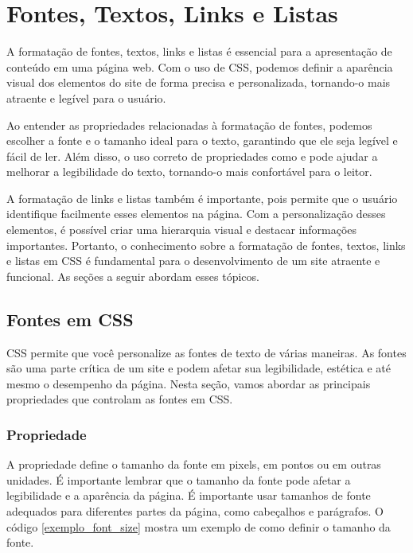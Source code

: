 \chapter{Fontes, Textos, Links e Listas}

A formatação de fontes, textos, links e listas é essencial para a apresentação de conteúdo em uma página web. Com o uso de CSS, podemos definir a aparência visual dos elementos do site de forma precisa e personalizada, tornando-o mais atraente e legível para o usuário.

Ao entender as propriedades relacionadas à formatação de fontes, podemos escolher a fonte e o tamanho ideal para o texto, garantindo que ele seja legível e fácil de ler. Além disso, o uso correto de propriedades como  e  pode ajudar a melhorar a legibilidade do texto, tornando-o mais confortável para o leitor.

A formatação de links e listas também é importante, pois permite que o usuário identifique facilmente esses elementos na página. Com a personalização desses elementos, é possível criar uma hierarquia visual e destacar informações importantes. Portanto, o conhecimento sobre a formatação de fontes, textos, links e listas em CSS é fundamental para o desenvolvimento de um site atraente e funcional. As seções a seguir abordam esses tópicos.

\section{Fontes em CSS}

CSS permite que você personalize as fontes de texto de várias maneiras. As fontes são uma parte crítica de um site e podem afetar sua legibilidade, estética e até mesmo o desempenho da página. Nesta seção, vamos abordar as principais propriedades que controlam as fontes em CSS.

\subsection{Propriedade }

A propriedade  define o tamanho da fonte em pixels, em pontos ou em outras unidades. É importante lembrar que o tamanho da fonte pode afetar a legibilidade e a aparência da página. É importante usar tamanhos de fonte adequados para diferentes partes da página, como cabeçalhos e parágrafos. O código \ref{exemplo_font_size} mostra um exemplo de como definir o tamanho da fonte.


